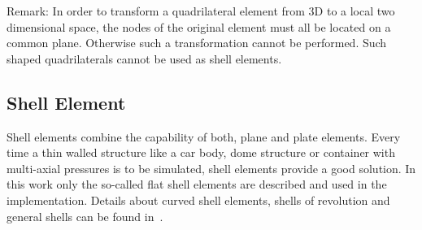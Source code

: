   Remark: In order to transform a quadrilateral element from 3D to a local two dimensional space, the nodes of the original element must all be located on a common plane. Otherwise such a transformation cannot be performed. Such shaped quadrilaterals cannot be used as shell elements.
 
 
 \subsection{Shell Element}\label{sec:Shell-Shell}
 Shell elements combine the capability of both, plane and plate elements. Every time a thin walled structure like a car body, dome structure or container with multi-axial pressures is to be simulated, shell elements provide a good solution. In this work only the so-called flat shell elements are described and used in the implementation. Details about curved shell elements, shells of revolution and general shells can be found in~\cite{cook2002concepts}.
 
